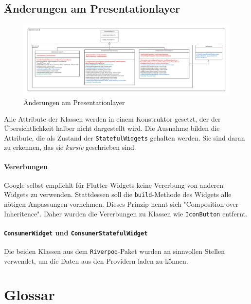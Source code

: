 \documentclass{implementierungsheft}
\begin{document}
\subsection{Änderungen am Presentationlayer}
\begin{figure}[htp]
    \centering
    \includegraphics[width=\textwidth]{images/uml/domainLayer.pdf}
    \caption{Änderungen am Presentationlayer}
    \label{fig:presentationLayer}
\end{figure}
Alle Attribute der Klassen werden in einem Konstruktor gesetzt, der der Übersichtlichkeit halber nicht dargestellt wird. Die Ausnahme bilden die Attribute, die als Zustand der \texttt{StatefulWidgets} gehalten werden. Sie sind daran zu erkennen, das sie \textit{kursiv} geschrieben sind.
\paragraph{Vererbungen}
Google selbst empfiehlt für Flutter-Widgets keine Vererbung von anderen Widgets zu verwenden. Stattdessen soll die \texttt{build}-Methode des Widgets alle nötigen Anpassungen vornehmen. Dieses Prinzip nennt sich "Composition over Inheritence". Daher wurden die Vererbungen zu Klassen wie \texttt{IconButton} entfernt.
\paragraph{\texttt{ConsumerWidget} und \texttt{ConsumerStatefulWidget}} Die beiden Klassen aus dem \texttt{Riverpod}-Paket wurden an sinnvollen Stellen verwendet, um die Daten aus den Providern laden zu können.
\section{Glossar}
\printglossary[style=altlist]
\end{document}
